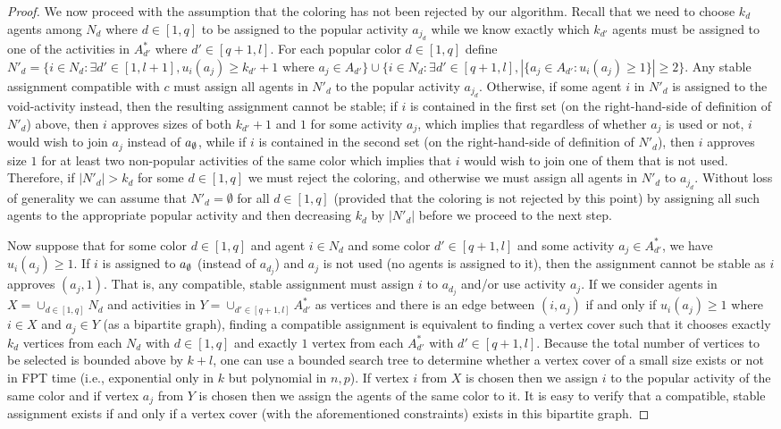 \begin{proof}
We now proceed with the assumption that the coloring has not been rejected by our algorithm. 
Recall that we need to choose $k_d$ agents among $N_d$ where $d\in [1, q]$ to be assigned to the popular activity $a_{j_d}$ while we know exactly which $k_{d'}$ agents must be assigned to one of the activities in $A^*_{d'}$ where $d'\in [q+1, l]$.
For each popular color $d\in [1, q]$ define $N'_d = 
\{i \in N_d : \exists d'\in [1, l+1], u_i(a_j) \geq k_{d'}+1 \text{~where~} a_j\in A_{d'} \} \cup
\{i \in N_d : \exists d' \in [q+1, l], |\{a_j \in A_{d'} : u_i(a_j) \geq 1\}  | \geq 2\}$.
Any stable assignment compatible with $c$ must assign all agents in $N'_d$ to the popular activity $a_{j_d}$.
Otherwise, if some agent $i$ in $N'_d$ is assigned to the void-activity instead, then the resulting assignment cannot be stable;
if $i$ is contained in the first set (on the right-hand-side of definition of $N'_d$) above, then $i$ approves sizes of both $k_{d'}+1$ and $1$ for some activity $a_j$, which implies that regardless of whether $a_j$ is used or not, $i$ would wish to join $a_j$ instead of $a_{\emptyset}$, while if $i$ is contained in the second set (on the right-hand-side of definition of $N'_d$), then $i$ approves size $1$ for at least two non-popular activities of the same color which implies that $i$ would wish to join one of them that is not used. Therefore, if $|N'_d| > k_d$ for some $d \in [1, q]$ we must reject the coloring, and otherwise we must assign all agents in $N'_d$ to $a_{j_d}$.
Without loss of generality we can assume that $N'_d = \emptyset$ for all $d\in [1, q]$ (provided that the coloring is not rejected by this point) by assigning all such agents to the appropriate popular activity and then decreasing $k_d$ by $|N'_d|$ before we proceed to the next step. 

Now suppose that for some color $d\in [1,q]$ and agent $i\in N_d$ and some color $d'\in [q+1, l]$ and some activity $a_j\in A^*_{d'}$, we have $u_i(a_j) \geq 1$. If $i$ is assigned to $a_{\emptyset}$ (instead of $a_{d_j}$) and $a_j$ is not used (no agents is assigned to it), then the assignment cannot be stable as $i$ approves $(a_j, 1)$. That is, any compatible, stable assignment must assign $i$ to $a_{d_j}$ and/or use activity $a_j$. If we consider agents in $X = \cup_{d\in [1,q]} N_d$ and activities in $Y = \cup_{d'\in [q+1,l]} A^*_{d'}$ as vertices and there is an edge between $(i, a_j)$ if and only if $u_i(a_j) \geq 1$ where $i\in X$ and $a_j \in Y$ (as a bipartite graph), finding a compatible assignment is equivalent to finding a vertex cover such that it chooses exactly $k_d$ vertices from each $N_d$ with $d\in [1, q]$ and exactly $1$ vertex from each $A^*_{d'}$ with $d'\in [q+1, l]$. Because the total number of vertices to be selected is bounded above by $k+l$, one can use a bounded search tree to determine whether a vertex cover of a small size exists or not in FPT time (i.e., exponential only in $k$ but polynomial in $n,p$). If vertex $i$ from $X$ is chosen then we assign $i$ to the popular activity of the same color and if vertex $a_j$ from $Y$ is chosen then we assign the agents of the same color to it. It is easy to verify that a compatible, stable assignment exists if and only if a vertex cover (with the aforementioned constraints) exists in this bipartite graph. 


\end{proof}
